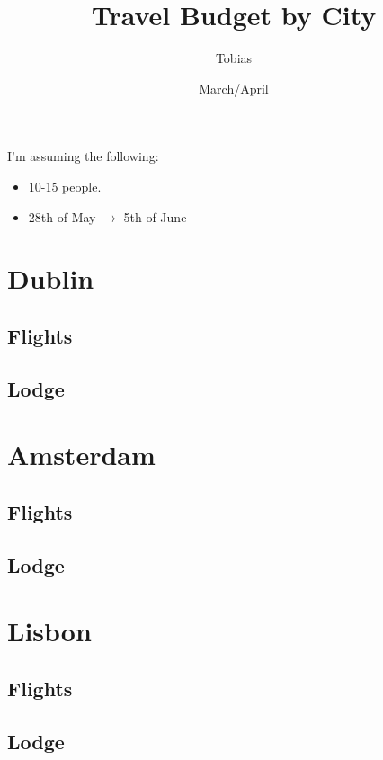 \documentclass[12pt]{article}
\title{Travel Budget by City}
\author{Tobias}
\date{March/April}
\begin{document}
	\maketitle
	I'm assuming the following:
	\begin{itemize}
		\item 10-15 people.
		\item 28th of May $\rightarrow$ 5th of June
	\end{itemize}
	
	\section{Dublin}
	\subsection{Flights}
	
	\subsection{Lodge}
	
	\section{Amsterdam}
	
	\subsection{Flights}
	
	\subsection{Lodge}
	
	\section{Lisbon}
	
	\subsection{Flights}
	
	\subsection{Lodge}
\end{document}
